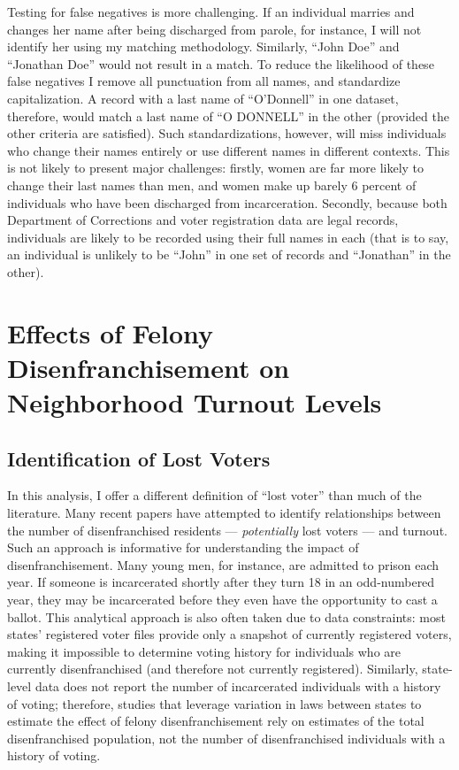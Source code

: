 \documentclass[]{article}
\begin{document}
Testing for false negatives is more challenging. If an individual marries and changes her name after being discharged from parole, for instance, I will not identify her using my matching methodology. Similarly, ``John Doe'' and ``Jonathan Doe'' would not result in a match. To reduce the likelihood of these false negatives I remove all punctuation from all names, and standardize capitalization. A record with a last name of ``O'Donnell'' in one dataset, therefore, would match a last name of ``O DONNELL'' in the other (provided the other criteria are satisfied). Such standardizations, however, will miss individuals who change their names entirely or use different names in different contexts. This is not likely to present major challenges: firstly, women are far more likely to change their last names than men, and women make up barely 6 percent of individuals who have been discharged from incarceration. Secondly, because both Department of Corrections and voter registration data are legal records, individuals are likely to be recorded using their full names in each (that is to say, an individual is unlikely to be ``John'' in one set of records and ``Jonathan'' in the other).

\hypertarget{effects-of-felony-disenfranchisement-on-neighborhood-turnout-levels}{%
\section{Effects of Felony Disenfranchisement on Neighborhood Turnout Levels}\label{effects-of-felony-disenfranchisement-on-neighborhood-turnout-levels}}

\hypertarget{identification-of-lost-voters}{%
\subsection*{Identification of Lost Voters}\label{identification-of-lost-voters}}

In this analysis, I offer a different definition of ``lost voter'' than much of the literature. Many recent papers have attempted to identify relationships between the number of disenfranchised residents --- \emph{potentially} lost voters --- and turnout. Such an approach is informative for understanding the impact of disenfranchisement. Many young men, for instance, are admitted to prison each year. If someone is incarcerated shortly after they turn 18 in an odd-numbered year, they may be incarcerated before they even have the opportunity to cast a ballot. This analytical approach is also often taken due to data constraints: most states' registered voter files provide only a snapshot of currently registered voters, making it impossible to determine voting history for individuals who are currently disenfranchised (and therefore not currently registered). Similarly, state-level data does not report the number of incarcerated individuals with a history of voting; therefore, studies that leverage variation in laws between states to estimate the effect of felony disenfranchisement rely on estimates of the total disenfranchised population, not the number of disenfranchised individuals with a history of voting.
\end{document}
